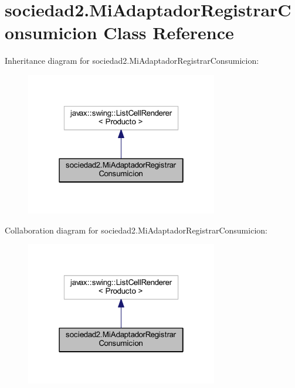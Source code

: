 \hypertarget{classsociedad2_1_1_mi_adaptador_registrar_consumicion}{}\section{sociedad2.\+Mi\+Adaptador\+Registrar\+Consumicion Class Reference}
\label{classsociedad2_1_1_mi_adaptador_registrar_consumicion}


Inheritance diagram for sociedad2.\+Mi\+Adaptador\+Registrar\+Consumicion\+:\nopagebreak
\begin{figure}[H]
\begin{center}
\leavevmode
\includegraphics[width=238pt]{classsociedad2_1_1_mi_adaptador_registrar_consumicion__inherit__graph}
\end{center}
\end{figure}


Collaboration diagram for sociedad2.\+Mi\+Adaptador\+Registrar\+Consumicion\+:\nopagebreak
\begin{figure}[H]
\begin{center}
\leavevmode
\includegraphics[width=238pt]{classsociedad2_1_1_mi_adaptador_registrar_consumicion__coll__graph}
\end{center}
\end{figure}
